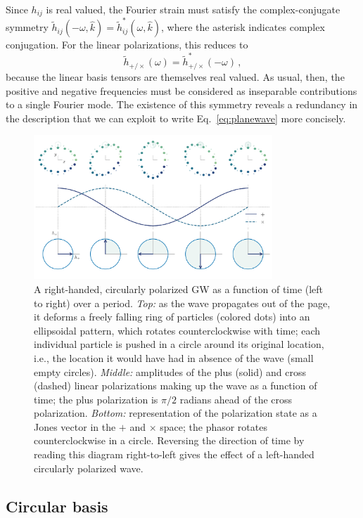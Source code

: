 \documentclass[aps,prd,twocolumn,superscriptaddress,preprintnumbers,floatfix,nofootinbib]{revtex4-2}
\newcommand{\beq}{\begin{equation}}
\newcommand{\eeq}{\end{equation}}
\begin{document}
Since $h_{ij}$ is real valued, the Fourier strain must  satisfy the complex-conjugate symmetry $\tilde{h}_{ij}(-\omega, \hat{k}) = \tilde{h}_{ij}^*(\omega,\hat{k})$, where the asterisk indicates complex conjugation.
For the linear polarizations, this reduces to
\beq \label{eq:sym_linear}
\tilde{h}_{+/\times}(\omega) = \tilde{h}_{+/\times}^*(-\omega)\, ,
\eeq
because the linear basis tensors are themselves real valued.
As usual, then, the positive and negative frequencies must be considered as inseparable contributions to a single Fourier mode.
The existence of this symmetry reveals a redundancy in the description that we can exploit to write Eq.~\eqref{eq:planewave} more concisely.

\begin{figure}
\includegraphics[width=0.8\textwidth]{pol_diagram_circ}
\caption{A right-handed, circularly polarized GW as a function of time (left to right) over a period. \emph{Top:} as the wave propagates out of the page, it deforms a freely falling ring of particles (colored dots) into an ellipsoidal pattern, which rotates counterclockwise with time; each individual particle is pushed in a circle around its original location, i.e., the location it would have had in absence of the wave (small empty circles).
\emph{Middle:} amplitudes of the plus (solid) and cross (dashed) linear polarizations making up the wave as a function of time; the plus polarization is $\pi/2$ radians ahead of the cross polarization.
\emph{Bottom:} representation of the polarization state as a Jones vector in the $+$ and $\times$ space; the phasor rotates counterclockwise in a circle.
Reversing the direction of time by reading this diagram right-to-left gives the effect of a left-handed circularly polarized wave.
}
\label{fig:pol_diagram_circ}
\end{figure}

\subsection{Circular basis}
\end{document}
